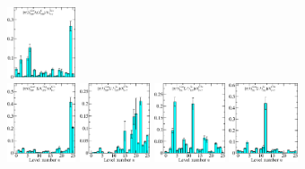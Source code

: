 \begin{figure}[H]
    \includegraphics[width=0.18\textwidth]{figures/sigmas/g1u/zfactors/zfactor_isotriplet_pion_lambda-G1u_1-P011-A2m-SS_0-P0-1-1-G-SS_0.pdf}\\
    \hspace*{-0.1cm}
    \includegraphics[width=0.18\textwidth]{figures/sigmas/g1u/zfactors/zfactor_isotriplet_pion_sigma-G1u_1-P000-A1um-SS_0-P000-G1g-SS_3.pdf}
    \hspace{-0.1cm}\includegraphics[width=0.185\textwidth]{figures/sigmas/g1u/zfactors/zfactor_isotriplet_pion_sigma-G1u_1-P001-A2m-SS_0-P00-1-G1-SS_0.pdf}
    \hspace{-0.1cm}\includegraphics[width=0.185\textwidth]{figures/sigmas/g1u/zfactors/zfactor_isotriplet_pion_sigma-G1u_1-P001-A2m-SS_1-P00-1-G1-SS_0.pdf}
    \includegraphics[width=0.18\textwidth]{figures/sigmas/g1u/zfactors/zfactor_isotriplet_pion_sigma-G1u_1-P001-A2m-SS_1-P00-1-G1-SS_2.pdf}\\[-0.3cm]

\end{figure}
